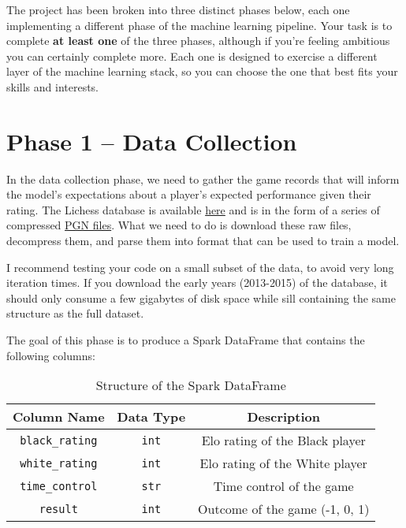 \documentclass{article}
\begin{document}
The project has been broken into three distinct phases below, each one implementing
a different phase of the machine learning pipeline. Your task is to complete
\textbf{at least one} of the three phases, although if you're feeling ambitious
you can certainly complete more. Each one is designed to exercise a different
layer of the machine learning stack, so you can choose the one that best fits
your skills and interests.

\section*{Phase 1 – Data Collection}

In the data collection phase, we need to gather the game records that will inform
the model's expectations about a player's expected performance given their rating.
The Lichess database is available \href{http://database.lichess.org/}{here} and is in the
form of a series of compressed \href{https://en.wikipedia.org/wiki/Portable\_Game\_Notation}{PGN files}.
What we need to do is download these raw files, decompress them, and parse them into format
that can be used to train a model.

I recommend testing your code on a small subset of the data, to avoid very long iteration
times. If you download the early years (2013-2015) of the database, it should only consume
a few gigabytes of disk space while sill containing the same structure as the full dataset.

The goal of this phase is to produce a Spark DataFrame that contains the following columns:

\begin{table}[ht]
\centering
\begin{tabular}{|c|c|c|}
\hline
\textbf{Column Name} & \textbf{Data Type} & \textbf{Description} \\
\hline
\texttt{black\_rating} & \texttt{int} & Elo rating of the Black player \\
\hline
\texttt{white\_rating} & \texttt{int} & Elo rating of the White player \\
\hline
\texttt{time\_control} & \texttt{str} & Time control of the game \\
\hline
\texttt{result} & \texttt{int} & Outcome of the game (-1, 0, 1) \\
\hline
\end{tabular}
\caption{Structure of the Spark DataFrame}
\label{tab:dataframe_structure}
\end{table}
\end{document}
